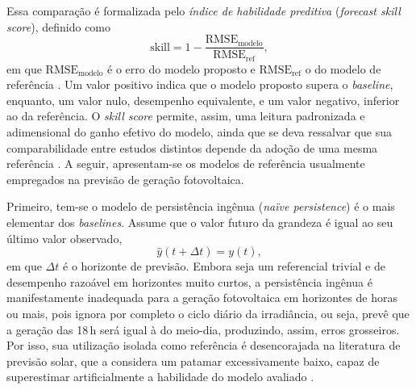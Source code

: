 Essa comparação é formalizada pelo \emph{índice de habilidade preditiva} (\emph{forecast
skill score}), definido como
\begin{equation}
    \mathrm{skill} = 1 - \frac{\mathrm{RMSE}_{\mathrm{modelo}}}{\mathrm{RMSE}_{\mathrm{ref}}},
    \label{eq:skill}
\end{equation}
em que $\mathrm{RMSE}_{\mathrm{modelo}}$ é o erro do modelo proposto e
$\mathrm{RMSE}_{\mathrm{ref}}$ o do modelo de referência \cite{Sarmas2022}. Um valor positivo
indica que o modelo proposto supera o \emph{baseline}, enquanto, um valor nulo, desempenho
equivalente, e um valor negativo, inferior ao da referência. O \emph{skill
score} permite, assim, uma leitura padronizada e adimensional do ganho efetivo do modelo,
ainda que se deva ressalvar que sua comparabilidade entre estudos distintos depende da
adoção de uma mesma referência \cite{Markovics2022}. A seguir, apresentam-se os modelos de
referência usualmente empregados na previsão de geração fotovoltaica.

Primeiro, tem-se o modelo de persistência ingênua (\emph{naïve persistence}) é o mais elementar dos \emph{baselines}. Assume que o valor futuro da grandeza é igual ao seu último valor
observado,
\begin{equation}
    \hat{y}(t + \Delta t) = y(t),
    \label{eq:persistencia_naive}
\end{equation}
em que $\Delta t$ é o horizonte de previsão. Embora seja um referencial trivial e de
desempenho razoável em horizontes muito curtos, a persistência ingênua é manifestamente
inadequada para a geração fotovoltaica em horizontes de horas ou mais, pois ignora por
completo o ciclo diário da irradiância, ou seja, prevê que a geração das 18\,h será igual à do meio-dia, produzindo, assim, erros grosseiros. Por isso, sua utilização isolada como referência é desencorajada na literatura de previsão solar, que a
considera um patamar excessivamente baixo, capaz de superestimar artificialmente a
habilidade do modelo avaliado \cite{Sarmas2022}.

